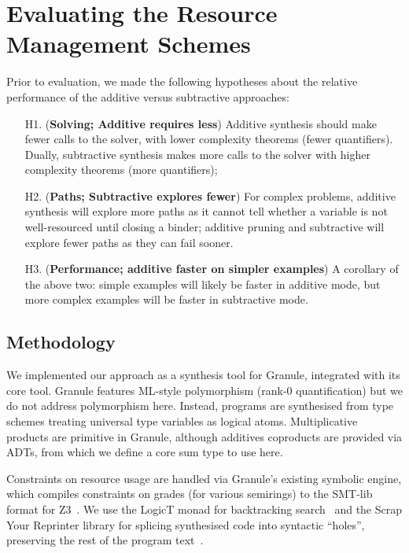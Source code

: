 \section{Evaluating the Resource Management Schemes}
\label{sec:linear-base-evaluation}

\newcommand{\stderr}[1]{\textcolor{gray}{${#1}$}} %
\newcommand{\fail}{\textcolor{mypink3}{$\times$}}
\newcommand{\success}{\checkmark}
\newcommand{\highlight}[1]{%
{\setlength{\fboxsep}{0pt}\colorbox{yellow!50}{$\displaystyle#1$}}}

Prior to evaluation, we made the following hypotheses about the
relative performance of the additive versus subtractive approaches:
%
\begin{enumerate}
\item[H1.] (\textbf{Solving; Additive requires less}) Additive synthesis should make fewer calls to the solver, with lower
complexity theorems (fewer quantifiers). Dually,
subtractive synthesis makes more calls to the solver with
higher complexity theorems (more quantifiers);

\item[H2.] (\textbf{Paths; Subtractive explores fewer}) For complex problems, additive synthesis will
explore more paths as it cannot tell whether a variable is not
well-resourced until closing a binder; additive pruning and subtractive will
explore fewer paths as they can fail sooner.

\item[H3.] (\textbf{Performance; additive faster on simpler examples}) A corollary of the above two: simple examples will
likely be faster in additive mode, but more complex examples will be
faster in subtractive mode.
\end{enumerate}

\subsection{Methodology}
We implemented our approach as a synthesis tool for
Granule, integrated with its core tool. Granule features
ML-style polymorphism (rank-0 quantification) but we do not address polymorphism here.
Instead, programs are synthesised from type schemes treating universal
type variables as logical atoms. Multiplicative products are
primitive in Granule, although additives coproducts are provided via
ADTs, from which we define a core sum type to use here.

Constraints on resource usage are handled via Granule's existing
symbolic engine, which compiles constraints on grades (for various semirings)
to the SMT-lib format for Z3~\cite{z3}.
We use the LogicT
monad for backtracking search~\cite{logict}
and the Scrap Your Reprinter library for
splicing synthesised code into syntactic ``holes'',
preserving the rest of the program text~\cite{clarke2017scrap}.

